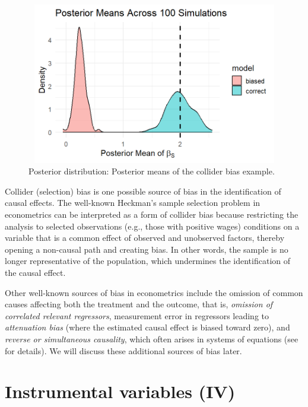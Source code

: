 \begin{figure}[h!]
	\includegraphics[width=340pt, height=200pt]{Chapters/chapter12/figures/FigColliderBias.png}
	\caption[List of figure caption goes here]{Posterior distribution: Posterior means of the collider bias example.}\label{fig12_2}
\end{figure}

Collider (selection) bias is one possible source of bias in the identification of causal effects. The well-known Heckman’s sample selection problem in econometrics \cite{heckman1979sample} can be interpreted as a form of collider bias because restricting the analysis to selected observations (e.g., those with positive wages) conditions on a variable that is a common effect of observed and unobserved factors, thereby opening a non-causal path and creating bias. In other words, the sample is no longer representative of the population, which undermines the identification of the causal effect. 

Other well-known sources of bias in econometrics include the omission of common causes affecting both the treatment and the outcome, that is, \textit{omission of correlated relevant regressors}, measurement error in regressors leading to \textit{attenuation bias} (where the estimated causal effect is biased toward zero), and \textit{reverse or simultaneous causality}, which often arises in systems of equations (see \cite{wooldridge2010econometric} for details). We will discuss these additional sources of bias later.

\section{Instrumental variables (IV)}

